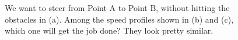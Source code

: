 \begin{figure}[htb]%
\centering
{}%
\hspace{5pt}%
\centering
{}%
\hspace{10pt}%
\centering
{}%
    \caption[]{We want to steer from Point A to Point B, without hitting the obstacles in (a). Among the speed profiles shown in (b) and (c), which one will get the job done? They look pretty similar.}
    \label{fig:PathsAroundObstacles}
\end{figure}

